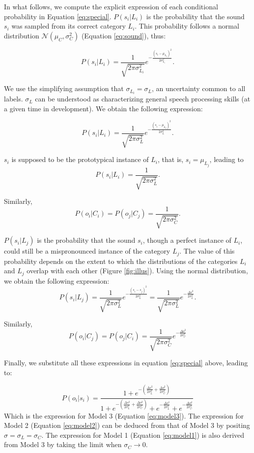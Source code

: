 \documentclass[english,,man]{apa6}
\begin{document}
In what follows, we compute the explicit expression of each conditional probability in Equation \ref{eq:special}. \(P(s_i | L_i)\) is the probability that the sound \(s_i\) was sampled from its correct category \(L_i\). This probability follows a normal distribution \(\mathcal{N}(\mu_C, \sigma^2_C)\) (Equation \ref{eq:sound}), thus:

\[P(s_i|L_i) = \frac{1}{\sqrt{2\pi\sigma^2_{L_i}}}e^{-\frac{(s_i-\mu_{L_j})^2}{2\sigma^2_{L_i}}}.\]

We use the simplifying assumption that \(\sigma_{L_i} = \sigma_L\), an uncertainty common to all labels. \(\sigma_L\) can be understood as characterizing general speech processing skills (at a given time in development). We obtain the following expression:

\[P(s_i | L_i) = \frac{1}{\sqrt{2\pi\sigma^2_L}} e^{-\frac{(s_i-\mu_{L_j})^2}{2\sigma^2_L}}.\]

\(s_i\) is supposed to be the prototypical instance of \(L_i\), that is, \(s_i=\mu_{L_j}\), leading to \[P(s_i | L_i) = \frac{1}{\sqrt{2\pi\sigma^2_L}}.\]

Similarly, \[P(o_i | C_i) = P(o_j | C_j) = \frac{1}{\sqrt{2\pi\sigma^2_C}}.\]

\(P(s_i | L_j)\) is the probability that the sound \(s_i\), though a perfect instance of \(L_i\), could still be a mispronounced instance of the category \(L_j\). The value of this probability depends on the extent to which the distributions of the categories \(L_i\) and \(L_j\) overlap with each other (Figure \ref{fig:illus}). Using the normal distribution, we obtain the following expression: \[P(s_i| L_j) = \frac{1}{\sqrt{2\pi\sigma^2_L}} e^{-\frac{(s_i-s_j)^2}{2\sigma^2_L}} = \frac{1}{\sqrt{2\pi\sigma^2_L}} e^{-\frac{\Delta s^2}{2\sigma^2_L}}.\]

Similarly, \[P(o_i| C_j) = P(o_j| C_i) = \frac{1}{\sqrt{2\pi\sigma^2_C}} e^{-\frac{\Delta o^2}{2\sigma^2_C}} \]

Finally, we substitute all these expressions in equation \ref{eq:special} above, leading to:

\[P(o_i|s_i)= \frac{1 + e^{- (\frac{\Delta s^2}{2\sigma_L^2}+ \frac{\Delta o^2}{2\sigma_C^2})}}{1 + e^{-(\frac{\Delta s^2}{2\sigma_L^2}+ \frac{\Delta o^2}{2\sigma_C^2})}+ e^{-\frac{\Delta s^2}{2\sigma_L^2}} + e^{-\frac{\Delta o^2}{2\sigma_C^2}}}\]
Which is the expression for Model 3 (Equation \ref{eq:model3}). The expression for Model 2 (Equation \ref{eq:model2}) can be deduced from that of Model 3 by positing \(\sigma= \sigma_L = \sigma_C\). The expression for Model 1 (Equation \ref{eq:model1}) is also derived from Model 3 by taking the limit when \(\sigma_C \rightarrow 0\).
\end{document}
